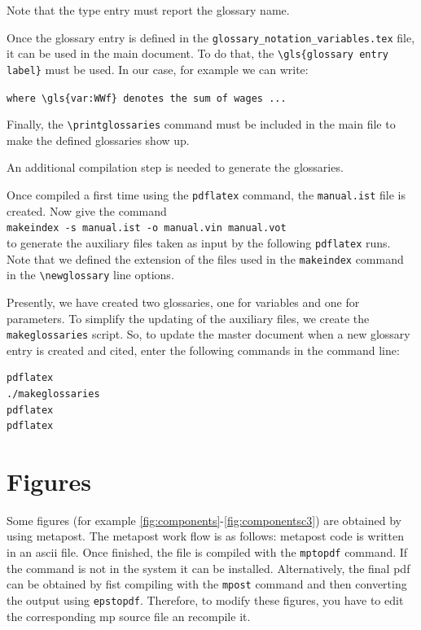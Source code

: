 \documentclass{book}
\begin{document}
Note that the type entry must report the glossary name.

Once the glossary entry is defined in the \verb+glossary_notation_variables.tex+ file, it can be used in the main document. To do that, the 
\verb+\gls{glossary entry label}+ must be used. In our case, for example we can write:

\verb+where \gls{var:WWf} denotes the sum of wages ...+

Finally, the \verb+\printglossaries+ command must be included in the main file to make the defined glossaries show up. 

An additional compilation step is needed to generate the glossaries.

Once compiled a first time using the \verb+pdflatex+ command, the \verb+manual.ist+ file is created. Now give the command\\
\verb+makeindex -s manual.ist -o manual.vin manual.vot+\\
to generate the auxiliary files taken as input by the following \verb+pdflatex+ runs. Note that we defined the extension of the files used in the \verb+makeindex+ command in the \verb+\newglossary+ line options.

Presently, we have created two glossaries, one for variables and one for parameters.
To simplify the updating of the auxiliary files, we create the \verb+makeglossaries+ script. So, to update the master document when a new glossary entry is created and cited, enter the following commands in the command line:

\begin{verbatim}
pdflatex
./makeglossaries
pdflatex
pdflatex
\end{verbatim}


\section{Figures}

Some figures (for example \ref{fig:components}-\ref{fig:componentsc3}) are obtained by using metapost.
The metapost work flow is as follows: metapost code is written in an ascii file.   
Once finished, the file is compiled with the \verb+mptopdf+ command. If the command is not in the system it can be installed. Alternatively, the final pdf can be obtained by fist compiling with the \verb+mpost+ command and then converting the output using \verb+epstopdf+.
Therefore, to modify these figures, you have to edit the corresponding mp source file an recompile it. 
\end{document}
